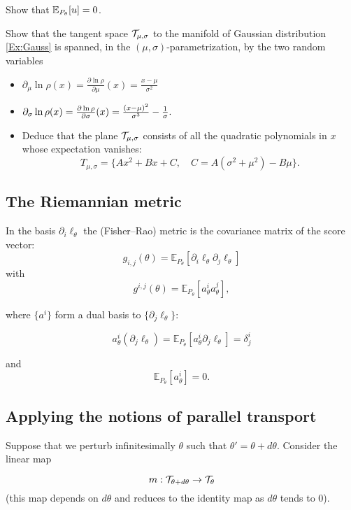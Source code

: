 {\begin{ex}\label{Ex:esp0}
  Show that $\mathbb{E}_{P_{\theta}}[u]=0$.
\end{ex}

\begin{ex}\label{Gauss2}
Show that the tangent space $\mathcal{T}_{\mu,\sigma} $ to the manifold of Gaussian distribution \eqref{Ex:Gauss} is spanned, in the $(\mu, \sigma)$-parametrization, by the two random variables

\begin{itemize}
    \item ${\partial_\mu \ln \rho (x) = \frac{\partial \ln \rho}{\partial \mu}(x)  =\frac{x-\mu }{
\sigma^2}}$
\item ${\partial_\sigma \ln \rho (x) = \frac{\partial \ln \rho }{ \partial \sigma}(x)  =\frac{(x-\mu)^2 }{\sigma^3}-{1\over \sigma}}.$
\item Deduce that the plane $\mathcal{T}_{\mu,\sigma}$ consists of all the quadratic polynomials in $x$ whose
expectation vanishes: 
\[
T_{\mu,\sigma}= \{ Ax^2+Bx+C, \quad C = A(\sigma^2 +\mu^2) -B\mu\}.
\]
\end{itemize}
\end{ex}

\subsection{The Riemannian metric}
  In the basis $\partial_i\ell_{\theta}$ the (Fisher--Rao) metric is the covariance matrix of the score vector:
\[   {g_{i,j}(\theta)=\mathbb{E}_{P_{\theta}}[\partial_i\ell_{\theta}\partial_{j}\ell_{\theta}]   } \]
 with   
\[{g^{i,j}(\theta)=\mathbb{E}_{P_{\theta}}[a^{i}_{\theta}a^{j}_{\theta}]},\] 

where  $\{a^{i}\}$ form a dual basis to $\{\partial_j\ell_{\theta}\}$:

\[a^{i}_{\theta}(\partial_j\ell_{\theta})=\mathbb{E}_{P_{\theta}}[a^{i}_{\theta}\partial_j\ell_{\theta}]=\delta^i_{j}\]

and
\[
\mathbb{E}_{P_{\theta}}[a^{i}_{\theta}]=0.
\]


\subsection{Applying the notions of parallel transport}
Suppose that we perturb infinitesimally $\theta $ such that $ \theta'=\theta+d\theta$.
Consider the linear map

\[
m:\mathcal{T}_{\theta+d\theta}\to \mathcal{T}_{\theta}
\] (this map depends on $d\theta$ and reduces to the identity map as $d\theta$ tends to 0). 

}
